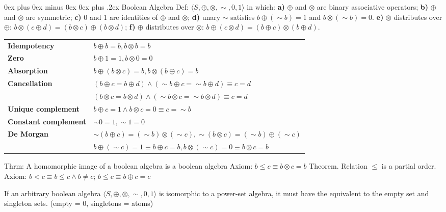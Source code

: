 \documentclass[letterpaper, 8pt]{extarticle}
\makeatletter
\renewcommand{\subsection}{\@startsection{subsection}{2}{0mm}%
                                {0ex plus 0ex minus 0ex}%
                                {0ex plus .2ex}%
                                {\normalfont\small\bfseries}}
\makeatother
\begin{document}
\begin{multicols*}{3}
    \subsection{Boolean Algebra}
    Def: $\langle S, \oplus, \otimes, \sim, 0, 1 \rangle$ in which:
    \textbf{a)} $\oplus$ and $\otimes$ are binary associative operators;
    \textbf{b)} $\oplus$ and $\otimes$ are symmetric;
    \textbf{c)} $0$ and $1$ are identities of $\oplus$ and $\otimes$;
    \textbf{d)} unary $\sim$ satisfies $b \oplus (\sim b) = 1$ and $b \otimes (\sim b) = 0$.
    \textbf{e)} $\otimes$ distributes over $\oplus$: $b \otimes (c \oplus d) = (b \otimes c) \oplus (b \otimes d)$;
    \textbf{f)} $\oplus$ distributes over $\otimes$: $b \oplus (c \otimes d) = (b \oplus c) \otimes (b \oplus d)$.

    \begin{tabulary}{\linewidth}{@{}LL@{}}
        \textbf{Idempotency} & $b \oplus b = b, b \otimes b = b$ \\
        \textbf{Zero} & $b \oplus 1 = 1, b \otimes 0 = 0$ \\
        \textbf{Absorption} & $b \oplus (b \otimes c) = b, b \otimes (b \oplus c) = b$ \\
        \textbf{Cancellation} & $(b \oplus c = b \oplus d) \land (\sim b \oplus c = \sim b \oplus d) \equiv c = d$ \\
                              & $(b \otimes c = b \otimes d) \land (\sim b \otimes c = \sim b \otimes d) \equiv c = d$ \\
        \textbf{Unique complement} & $b \oplus c = 1 \land b \otimes c = 0 \equiv c = \sim b$ \\
        \textbf{Constant complement} & $\sim 0 = 1, \sim 1 = 0$ \\
        \textbf{De Morgan} & $\sim (b \oplus c) = (\sim b) \otimes (\sim c), \sim (b \otimes c) = (\sim b) \oplus (\sim c)$ \\
        & $b \oplus (\sim c) = 1 \equiv b \oplus c = b, b \otimes (\sim c) = 0 \equiv b \otimes c = b$ \\
    \end{tabulary}
    
    Thrm: A homomorphic image of a boolean algebra is a boolean algebra
    Axiom: $b \leq c \equiv b \otimes c = b$ Theorem. Relation $\leq$ is a partial order.
    Axiom: $b < c \equiv b \leq c \land b \neq c$; $b \leq c \equiv b \oplus c = c$

    If an arbitrary boolean algebra $\langle S, \oplus, \otimes, \sim, 0, 1\rangle$ is
    isomorphic to a power-set algebra, it must have the equivalent to the empty set and singleton sets.
    (empty = 0, singletons = atoms)


\end{multicols*}
\end{document}
